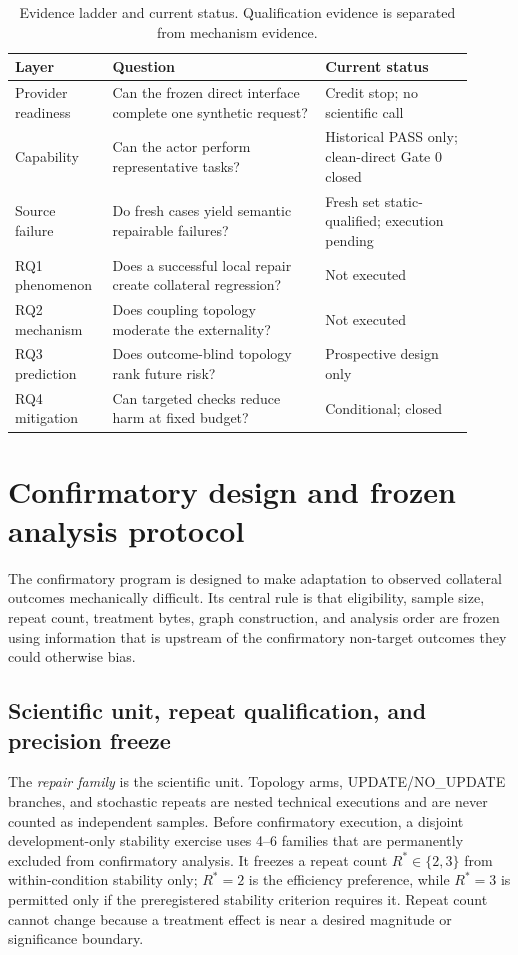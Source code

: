 \documentclass{article}
\begin{document}
\begin{table}[t]
\centering
\caption{Evidence ladder and current status. Qualification evidence is separated from mechanism evidence.}
\label{tab:ladder}
\small
\begin{tabular}{p{0.18\linewidth}p{0.43\linewidth}p{0.30\linewidth}}
\toprule
Layer & Question & Current status \\
\midrule
Provider readiness & Can the frozen direct interface complete one synthetic request? & Credit stop; no scientific call \\
Capability & Can the actor perform representative tasks? & Historical PASS only; clean-direct Gate 0 closed \\
Source failure & Do fresh cases yield semantic repairable failures? & Fresh set static-qualified; execution pending \\
RQ1 phenomenon & Does a successful local repair create collateral regression? & Not executed \\
RQ2 mechanism & Does coupling topology moderate the externality? & Not executed \\
RQ3 prediction & Does outcome-blind topology rank future risk? & Prospective design only \\
RQ4 mitigation & Can targeted checks reduce harm at fixed budget? & Conditional; closed \\
\bottomrule
\end{tabular}
\end{table}

\section{Confirmatory design and frozen analysis protocol}
\label{sec:confirmatory}
The confirmatory program is designed to make adaptation to observed collateral outcomes mechanically difficult. Its central rule is that eligibility, sample size, repeat count, treatment bytes, graph construction, and analysis order are frozen using information that is upstream of the confirmatory non-target outcomes they could otherwise bias.

\subsection{Scientific unit, repeat qualification, and precision freeze}
The \emph{repair family} is the scientific unit. Topology arms, UPDATE/NO\_UPDATE branches, and stochastic repeats are nested technical executions and are never counted as independent samples. Before confirmatory execution, a disjoint development-only stability exercise uses 4--6 families that are permanently excluded from confirmatory analysis. It freezes a repeat count $R^*\in\{2,3\}$ from within-condition stability only; $R^*=2$ is the efficiency preference, while $R^*=3$ is permitted only if the preregistered stability criterion requires it. Repeat count cannot change because a treatment effect is near a desired magnitude or significance boundary.
\end{document}
